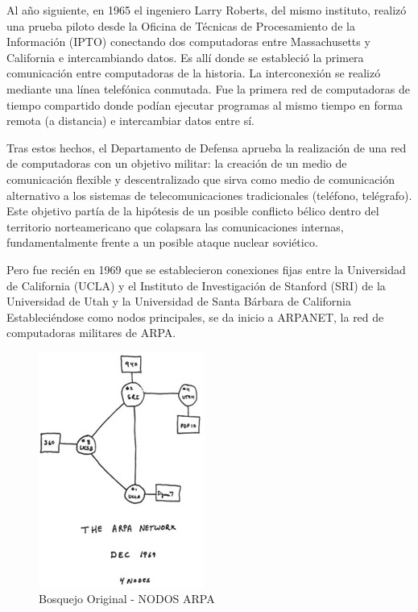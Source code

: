 \documentclass[
  letterpaper,
  DIV=11,
  numbers=noendperiod]{scrreprt}
\begin{document}
Al año siguiente, en 1965 el ingeniero Larry Roberts, del mismo
instituto, realizó una prueba piloto desde la Oficina de Técnicas de
Procesamiento de la Información (IPTO) conectando dos computadoras entre
Massachusetts y California e intercambiando datos. Es allí donde se
estableció la primera comunicación entre computadoras de la historia. La
interconexión se realizó mediante una línea telefónica conmutada. Fue la
primera red de computadoras de tiempo compartido donde podían ejecutar
programas al mismo tiempo en forma remota (a distancia) e intercambiar
datos entre sí.

Tras estos hechos, el Departamento de Defensa aprueba la realización de
una red de computadoras con un objetivo militar: la creación de un medio
de comunicación flexible y descentralizado que sirva como medio de
comunicación alternativo a los sistemas de telecomunicaciones
tradicionales (teléfono, telégrafo). Este objetivo partía de la
hipótesis de un posible conflicto bélico dentro del territorio
norteamericano que colapsara las comunicaciones internas,
fundamentalmente frente a un posible ataque nuclear soviético.

Pero fue recién en 1969 que se establecieron conexiones fijas entre la
Universidad de California (UCLA) y el Instituto de Investigación de
Stanford (SRI) de la Universidad de Utah y la Universidad de Santa
Bárbara de California Estableciéndose como nodos principales, se da
inicio a ARPANET, la red de computadoras militares de ARPA.

\begin{figure}[H]

{\centering \includegraphics{images_2_cap/5-nodos-ARPA.jpg}

}

\caption{Bosquejo Original - NODOS ARPA}

\end{figure}%
\end{document}
